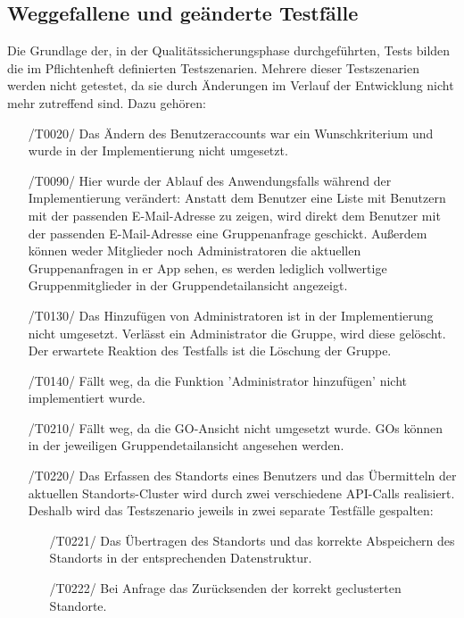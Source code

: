 \documentclass[11pt,a4paper]{scrartcl}
\begin{document}
\subsection{Weggefallene und geänderte Testfälle}\label{weggefallene Testfälle}
Die Grundlage der, in der Qualitätssicherungsphase durchgeführten, Tests bilden die im Pflichtenheft definierten Testszenarien.
Mehrere dieser Testszenarien werden nicht getestet, da sie durch Änderungen im Verlauf der Entwicklung nicht mehr zutreffend sind. Dazu gehören:
\begin{itemize}
	\item[/T0020/] Das Ändern des Benutzeraccounts war ein Wunschkriterium und wurde in der Implementierung nicht umgesetzt.
	
	\item[/T0090/] Hier wurde der Ablauf des Anwendungsfalls während der Implementierung verändert: Anstatt dem Benutzer eine Liste mit Benutzern mit der passenden E-Mail-Adresse zu zeigen, wird direkt dem Benutzer mit der passenden E-Mail-Adresse eine Gruppenanfrage geschickt. Außerdem können weder Mitglieder noch Administratoren die aktuellen Gruppenanfragen in er App sehen, es werden lediglich vollwertige Gruppenmitglieder in der Gruppendetailansicht angezeigt.
	
	\item[/T0130/]\label{130} Das Hinzufügen von Administratoren ist in der Implementierung nicht umgesetzt. Verlässt ein Administrator die Gruppe, wird diese gelöscht. Der erwartete Reaktion des Testfalls ist die Löschung der Gruppe.
	
	\item[/T0140/] Fällt weg, da die Funktion 'Administrator hinzufügen' nicht implementiert wurde.
	
	\item[/T0210/] Fällt weg, da die GO-Ansicht nicht umgesetzt wurde. GOs können in der jeweiligen Gruppendetailansicht angesehen werden.
	
	\item[/T0220/] Das Erfassen des Standorts eines Benutzers und das Übermitteln der aktuellen Standorts-Cluster wird durch zwei verschiedene API-Calls realisiert. Deshalb wird das Testszenario jeweils in zwei separate Testfälle gespalten:
	\begin{enumerate}
		\item[/T0221/] Das Übertragen des Standorts und das korrekte Abspeichern des Standorts in der entsprechenden Datenstruktur.\label{221}
		\item[/T0222/] Bei Anfrage das Zurücksenden der korrekt geclusterten Standorte.\label{222}
	\end{enumerate}
	

\end{itemize}
\end{document}
